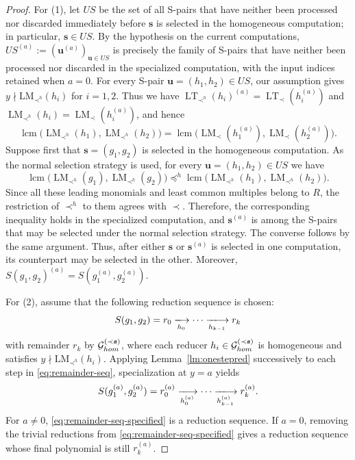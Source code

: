 \documentclass[10pt,a4paper]{amsart}
\begin{document}
\begin{proof}
For {\rm (1)}, let $US$ be the set of all S-pairs that have neither been processed nor discarded immediately before $\bm{s}$ is selected in the homogeneous computation; in particular, $\bm{s}\in US$.
By the hypothesis on the current computations, $US^{(a)}:=(\bm{u}^{(a)})_{\bm{u}\in US}$ is precisely the family of S-pairs that have neither been processed nor discarded in the specialized computation, with the input indices retained when $a=0$.
For every S-pair $\bm{u}=(h_1,h_2)\in US$, our assumption gives $y\nmid \mathrm{LM}_{\prec^h}(h_i)$ for $i=1,2$.
Thus we have $\operatorname{LT}_{\prec^h}(h_i)^{(a)}=\operatorname{LT}_{\prec}(h_i^{(a)})$ and $\operatorname{LM}_{\prec^h}(h_i)=\operatorname{LM}_{\prec}(h_i^{(a)})$, and hence
\[
\operatorname{lcm} \bigl(\operatorname{LM}_{\prec^h}(h_1),\operatorname{LM}_{\prec^h}(h_2)\bigr) = \operatorname{lcm}\bigl(\operatorname{LM}_{\prec}(h_1^{(a)}), \operatorname{LM}_{\prec}(h_2^{(a)})\bigr).
\]
Suppose first that $\bm{s}=(g_1,g_2)$ is selected in the homogeneous
computation.
As the normal selection strategy is used, for every
$\bm{u}=(h_1,h_2)\in US$ we have
\[
\operatorname{lcm}
\bigl(\operatorname{LM}_{\prec^h}(g_1),
      \operatorname{LM}_{\prec^h}(g_2)\bigr)
\preceq^h
\operatorname{lcm}
\bigl(\operatorname{LM}_{\prec^h}(h_1),
      \operatorname{LM}_{\prec^h}(h_2)\bigr).
\]
Since all these leading monomials and least common multiples belong to
$R$, the restriction of $\prec^h$ to them agrees with $\prec$.
Therefore, the corresponding inequality holds in the specialized
computation, and $\bm{s}^{(a)}$ is among the S-pairs that may be
selected under the normal selection strategy.
The converse follows by the same argument.
Thus, after either $\bm{s}$ or $\bm{s}^{(a)}$ is selected in one
computation, its counterpart may be selected in the other.
Moreover, $S(g_1,g_2)^{(a)}=S(g_1^{(a)},g_2^{(a)})$.

For {\rm (2)}, assume that the following reduction sequence is chosen:
\begin{equation}\label{eq:remainder-seq}
S(g_1,g_2)=r_0 \xlongrightarrow[h_0]{} \cdots \xlongrightarrow[h_{k-1}]{} r_k
\end{equation}
with remainder $r_k$ by $\mathcal{G}^{(\prec \bm{s})}_{\rm hom}$, where each reducer $h_i\in \mathcal{G}^{(\prec \bm{s})}_{\rm hom}$ is homogeneous and satisfies $y\nmid \mathrm{LM}_{\prec^h}(h_i)$.
Applying Lemma~\ref{lm:onestepred} successively to each step in \eqref{eq:remainder-seq}, specialization at $y=a$ yields \begin{equation}\label{eq:remainder-seq-specified}
S(g_1^{(a)},g_2^{(a)})=r_0^{(a)} \xlongrightarrow[h_0^{(a)}]{} \cdots \xlongrightarrow[h_{k-1}^{(a)}]{} r_k^{(a)}.
\end{equation}
For $a\neq0$, \eqref{eq:remainder-seq-specified} is a reduction sequence.
If $a=0$, removing the trivial reductions from \eqref{eq:remainder-seq-specified} gives a reduction sequence whose final polynomial is still $r_k^{(a)}$.


\end{proof}
\end{document}

